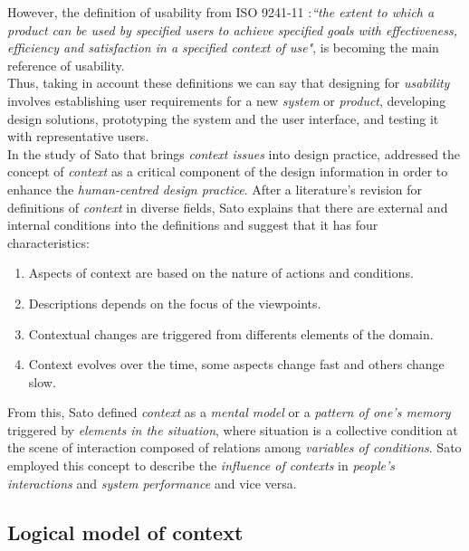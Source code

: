 However, the definition of usability from ISO
9241-11 \cite{international1998iso}:\textit{``the extent to which a
product can be used by specified users to achieve specified  goals
with effectiveness, efficiency and satisfaction in a  specified
context of use"}, is becoming the main reference of usability. \\
Thus, taking in account these definitions we can say that designing for 
\textit{usability} involves establishing user requirements for a new
\textit{system} or \textit{product}, developing design solutions,
prototyping the system and the user interface, and testing it with
representative users.\\
In the study of Sato \cite{sato2004context} that brings \textit{context
issues} into design practice, addressed the concept of
\textit{context} as a critical component of the design information in
order to enhance the \textit{human-centred design practice}. After a
literature's revision for  definitions of \textit{context} in diverse
fields, Sato explains that there are external and internal conditions
into the definitions and suggest that it has four characteristics:
\begin{enumerate}  
\item Aspects of context are based on the nature of actions and 
conditions.
\item Descriptions depends on the focus of the viewpoints.
\item Contextual changes are triggered from differents elements 
of the domain. 
\item Context evolves over the time, some aspects change fast
and others change slow. 
\end{enumerate} 
From this, Sato defined \textit{context} as a \textit{mental model} or a
\textit{pattern of one's memory} triggered by \textit{elements in the
situation}, where situation is a collective condition at the scene of
interaction composed of relations among \textit{variables of
conditions}. Sato employed this concept to describe the
\textit{influence of contexts} in \textit{people's interactions} and
\textit{system performance} and vice versa.

\subsection{Logical model of context} 

